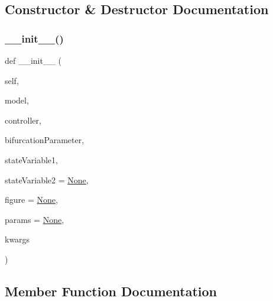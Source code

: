 \subsection{Constructor \& Destructor Documentation}
\mbox{\label{class_mu_mo_t_1_1_mu_mo_tbifurcation_view_ac1764fc6547304e629425a5329dc7083}} 
\subsubsection{\texorpdfstring{\+\_\+\+\_\+init\+\_\+\+\_\+()}{\_\_init\_\_()}}
{\footnotesize\ttfamily def \+\_\+\+\_\+init\+\_\+\+\_\+ (\begin{DoxyParamCaption}\item[{}]{self,  }\item[{}]{model,  }\item[{}]{controller,  }\item[{}]{bifurcation\+Parameter,  }\item[{}]{state\+Variable1,  }\item[{}]{state\+Variable2 = {\ttfamily \hyperlink{class_mu_mo_t_1_1_mu_mo_tbifurcation_view_ac7485dcc8d256a6f197ed7802687f252}{None}},  }\item[{}]{figure = {\ttfamily \hyperlink{class_mu_mo_t_1_1_mu_mo_tbifurcation_view_ac7485dcc8d256a6f197ed7802687f252}{None}},  }\item[{}]{params = {\ttfamily \hyperlink{class_mu_mo_t_1_1_mu_mo_tbifurcation_view_ac7485dcc8d256a6f197ed7802687f252}{None}},  }\item[{}]{kwargs }\end{DoxyParamCaption})}



\subsection{Member Function Documentation}
\mbox{\label{class_mu_mo_t_1_1_mu_mo_tbifurcation_view_a385e5f82733060fec5122635ae6a8e67}} 
